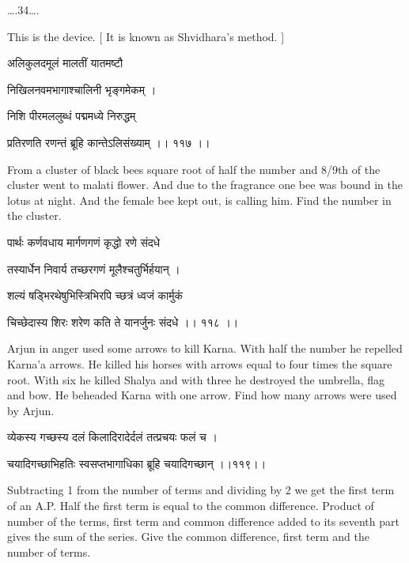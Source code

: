 \documentclass[]{article}
\date{}
\begin{document}
{\ldots{}.34\ldots{}. }

{This is the device. {[} It is known as Shvidhara's method. {]}}

{अलिकुलदमूलं मालतीं यातमष्टौ }

{निखिलनवमभागाश्चालिनी भृङ्गमेकम् । }

{निशि पीरमललुब्धं पद्ममध्ये निरुद्धम् }

{प्रतिरणति रणन्तं ब्रूहि कान्तेऽलिसंख्याम् ।। ११७ ।। }

{From a cluster of black bees square root of half the number and 8/9th
of the cluster went to malati flower. And due to the fragrance one bee
was bound in the lotus at night. And the female bee kept out, is calling
him. Find the number in the cluster.}

{पार्थः कर्णवधाय मार्गणगणं कृद्धो रणे संदधे }

{तस्यार्धेन निवार्य तच्छरगणं मूलैश्चतुर्भिर्हयान् । }

{शल्यं षड्भिरथेषुभिस्त्रिभिरपि च्छत्रं ध्वजं कार्मुकं }

{चिच्छेदास्य शिरः शरेण कति ते यानर्जुनः संदधे ।। ११८ ।। }

{Arjun in anger used some arrows to kill Karna. With half the number he
repelled Karna'a arrows. He killed his horses with arrows equal to four
times the square root. With six he killed Shalya and with three he
destroyed the umbrella, flag and bow. He beheaded Karna with one arrow.
Find how many arrows were used by Arjun.}

{व्येकस्य गच्छस्य दलं किलादिरादेर्दलं तत्प्रचयः फलं च । }

{चयादिगच्छाभिहतिः स्वसप्तभागाधिका ब्रूहि चयादिगच्छान् ।।११९।। }

{Subtracting 1 from the number of terms and dividing by 2 we get the
first term of an A.P. Half the first term is equal to the common
difference. Product of number of the terms, first term and common
difference added to its seventh part gives the sum of the series. Give
the common difference, first term and the number of terms.}
\end{document}
